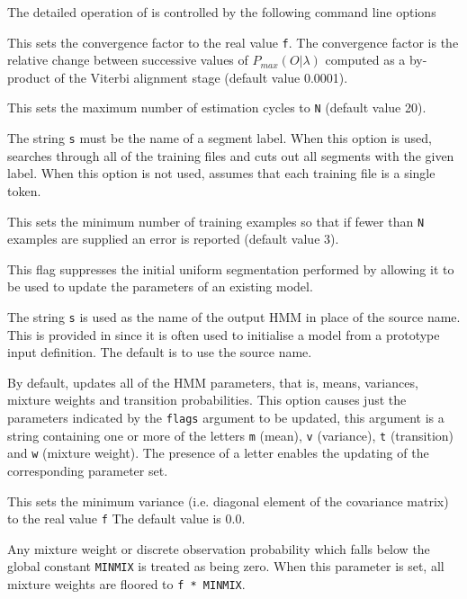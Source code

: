 The detailed operation of  is controlled by the following
command line options
\begin{optlist}

   This sets the convergence factor to the real value {\tt f}.
      The convergence factor is the relative change between successive
      values of $P_{max}({O}|\lambda)$ computed as a by-product
      of the Viterbi alignment stage (default value 0.0001).

   This sets the maximum number of estimation cycles
      to {\tt N} (default value 20).

   The string {\tt s} must be the name of a
      segment label.  When this option is used,  searches
      through all of the training files and cuts out all segments with
      the given label.  When this option is not used,  assumes that
      each training file is a single token.

    This sets the minimum number of training examples so
      that if fewer than {\tt N} examples are supplied an error is
      reported (default value 3).

    This flag suppresses the initial uniform
      segmentation performed by  allowing it to be used
      to update the parameters of an existing model.
  
    The string {\tt s} is used as the name of the output
      HMM in place of the source name.  This is provided in 
      since it is often used to initialise a model from a prototype
      input definition.  The default is to use the source name.

    By default,  updates all 
      of the HMM parameters,
      that is, means, variances, mixture weights
      and transition probabilities. This 
      option causes just the parameters indicated by the {\tt flags}
      argument to be updated, this argument is a string containing one
      or more of the letters {\tt m} (mean), {\tt v} (variance), 
      {\tt t} (transition) and {\tt w} (mixture weight).  The presence of a
      letter enables the updating of the corresponding parameter set.

    This sets the minimum variance (i.e. diagonal element of
      the covariance matrix) to the real value {\tt f} The default value
      is 0.0.

    Any mixture weight  or discrete observation probability
      which falls below the global
            constant {\tt MINMIX} is treated as being zero.
      When this parameter is  set,  all mixture weights  are floored
      to {\tt f * MINMIX}.

\stdoptB
\stdoptF
\stdoptG
\stdoptH
\stdoptI
\stdoptL
\stdoptM
\stdoptX

\end{optlist}

